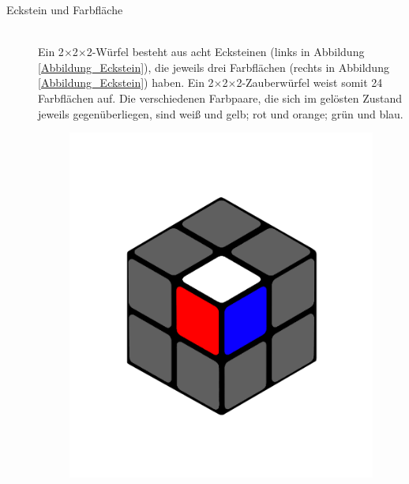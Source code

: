 \documentclass[12pt,a4paper, usenames, dvipsnames]{article}
\theoremstyle{mystyle}
\theoremstyle{definition}
\newcommand{\Ttwo}{2$\times$2$\times$2-}
\begin{document}
\begin{description}
\item[Eckstein und Farbfläche] \ \\
Ein \Ttwo Würfel besteht aus acht Ecksteinen (links in Abbildung \ref{Abbildung_Eckstein}), die jeweils drei Farbflächen (rechts in Abbildung \ref{Abbildung_Eckstein}) haben. Ein \Ttwo Zauberwürfel weist somit 24 Farbflächen auf. Die verschiedenen Farbpaare, die sich im gelösten Zustand jeweils gegenüberliegen, sind weiß und gelb; rot und orange; grün und blau.
\begin{figure}[h]
\centering
\includegraphics[scale=0.1]{2x2stein.png}

\end{figure}
\end{description}
\end{document}
